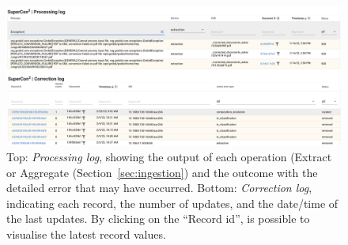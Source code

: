 \documentclass[]{interact}
\theoremstyle{plain} %
\theoremstyle{definition}
\theoremstyle{remark}
\begin{document}
\begin{figure}[ht]
  \centering
  \includegraphics[width=1\textwidth]{images/processing-curation-log.png} 
  \caption{Top: \textit{Processing log}, showing the output of each operation (Extract or Aggregate (Section~\ref{sec:ingestion}) and the outcome with the detailed error that may have occurred. Bottom: \textit{Correction log}, indicating each record, the number of updates, and the date/time of the last updates. By clicking on the ``Record id'', is possible to visualise the latest record values.}
  \label{fig:processing-curation-log}
\end{figure}
\end{document}
